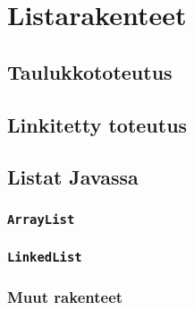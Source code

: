 \chapter{Listarakenteet}

\section{Taulukkototeutus}

\section{Linkitetty toteutus}

\section{Listat Javassa}

\subsection{\texttt{ArrayList}}

\subsection{\texttt{LinkedList}}

\subsection{Muut rakenteet}


